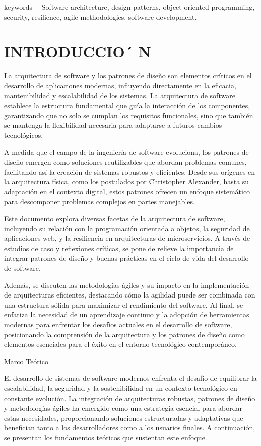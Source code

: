 \documentclass[12pt]{article}
\begin{document}
keywords— Software architecture, design patterns, object-oriented programming, security, resilience, agile methodologies, software development.

\section*{INTRODUCCIO´ N}
La arquitectura de software y los patrones de diseño son elementos críticos en el desarrollo de aplicaciones modernas, influyendo directamente en la eficacia, mantenibilidad y escalabilidad de los sistemas. La arquitectura de software establece la estructura fundamental que guía la interacción de los componentes, garantizando que no solo se cumplan los requisitos funcionales, sino que también se mantenga la flexibilidad necesaria para adaptarse a futuros cambios tecnológicos.

A medida que el campo de la ingeniería de software evoluciona, los patrones de diseño emergen como soluciones reutilizables que abordan problemas comunes, facilitando así la creación de sistemas robustos y eficientes. Desde sus orígenes en la arquitectura física, como los postulados por Christopher Alexander, hasta su adaptación en el contexto digital, estos patrones ofrecen un enfoque sistemático para descomponer problemas complejos en partes manejables.

Este documento explora diversas facetas de la arquitectura de software, incluyendo su relación con la programación orientada a objetos, la seguridad de aplicaciones web, y la resiliencia en arquitecturas de microservicios. A través de estudios de caso y reflexiones críticas, se pone de relieve la importancia de integrar patrones de diseño y buenas prácticas en el ciclo de vida del desarrollo de software.

Además, se discuten las metodologías ágiles y su impacto en la implementación de arquitecturas eficientes, destacando cómo la agilidad puede ser combinada con una estructura sólida para maximizar el rendimiento del software. Al final, se enfatiza la necesidad de un aprendizaje continuo y la adopción de herramientas modernas para enfrentar los desafíos actuales en el desarrollo de software, posicionando la comprensión de la arquitectura y los patrones de diseño como elementos esenciales para el éxito en el entorno tecnológico contemporáneo.

Marco Teórico

El desarrollo de sistemas de software modernos enfrenta el desafío de equilibrar la escalabilidad, la seguridad y la sostenibilidad en un contexto tecnológico en constante evolución. La integración de arquitecturas robustas, patrones de diseño y metodologías ágiles ha emergido como una estrategia esencial para abordar estas necesidades, proporcionando soluciones estructuradas y adaptativas que benefician tanto a los desarrolladores como a los usuarios finales. A continuación, se presentan los fundamentos teóricos que sustentan este enfoque.
\end{document}
